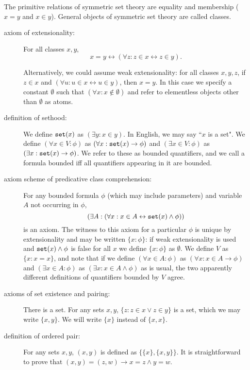 \documentclass[12pt]{article}
\begin{document}
The primitive relations of symmetric set theory  are equality and membership ($x=y$ and $x \in y$).   General objects of symmetric set theory are called classes.

\begin{description}

\item[axiom of extensionality:]  For all classes $x,y$, $$x=y \leftrightarrow (\forall z:z\in x \leftrightarrow z \in y).$$

Alternatively, we could assume weak extensionality:  for all classes $x,y,z$, if $z \in x$ and $(\forall u: u \in x \leftrightarrow u \in y)$, then $x=y$.  In this case
we specify a constant $\emptyset$ such that $(\forall x: x \not\in \emptyset)$ and refer to elementless objects other than $\emptyset$ as atoms.

\item[definition of sethood:]  We define ${\tt set}(x)$ as $(\exists y:x \in y)$.  In English, we may say ``$x$ is a set".  We define $(\forall x \in V:\phi)$ as $(\forall x:{\tt set}(x) \rightarrow \phi)$
and $(\exists x \in V:\phi)$ as $(\exists x:{\tt set}(x) \rightarrow \phi)$.  We refer to these as bounded quantifiers, and we call a formula bounded iff all quantifiers appearing in it
are bounded.

\item[axiom scheme of predicative class comprehension:]  For any bounded formula $\phi$ (which may include parameters) and variable $A$ not occurring in $\phi$, $$(\exists A:(\forall x:x \in A \leftrightarrow {\tt set}(x) \wedge \phi))$$ is an axiom.  The witness to this axiom for a particular $\phi$ is unique by extensionality and may be written $\{x:\phi\}$:  if weak extensionality is used and  ${\tt set}(x) \wedge \phi$ is false for all $x$ we define $\{x:\phi\}$ as $\emptyset$.   We define
$V$ as $\{x:x=x\}$, and note that if we define  $(\forall x \in A:\phi)$ as $(\forall x:x \in A \rightarrow \phi)$ and $(\exists x \in A:\phi)$ as $(\exists x:x\in A \wedge \phi)$ as is usual, the two apparently different definitions of quantifiers bounded by $V$ agree.

\item[axioms of set existence and pairing:]   There is a set.  For any sets $x,y$, $\{z:z \in x \vee z \in y\}$ is a set, which we may write $\{x,y\}$.  We will write $\{x\}$ instead of $\{x,x\}$.

\item[definition of ordered pair:]  For any sets $x,y$, $(x,y)$ is defined as $\{\{x\},\{x,y\}\}$.   It is straightforward to prove that $(x,y)=(z,w) \rightarrow x=z \wedge y=w$.


\end{description}
\end{document}

